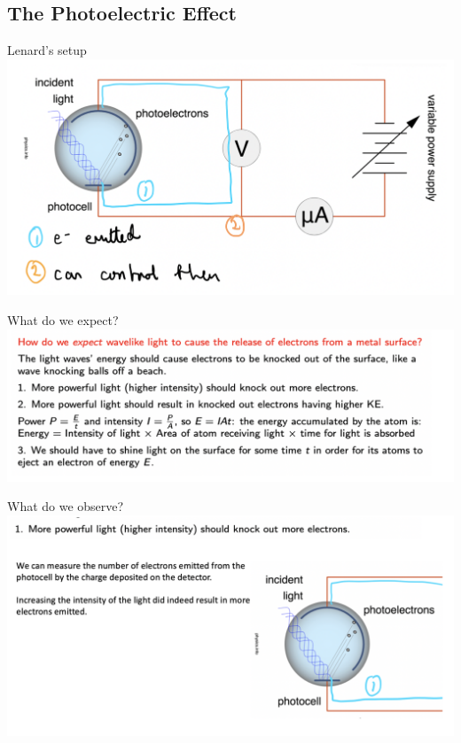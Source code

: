 \subsection{The Photoelectric Effect}


\begin{frame}{Lenard's setup}
\small
\includegraphics[scale=0.4]{setup}
\end{frame}

\begin{frame}{What do we expect?}
\small
\includegraphics[scale=0.4]{expectations}
\end{frame}

\begin{frame}{What do we observe?}
\small
\includegraphics[scale=0.4]{observe1}
\end{frame}
 
